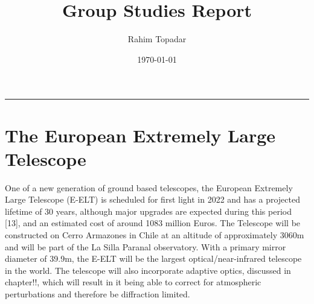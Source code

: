 \documentclass[pdf,color]{UoBnote}
\author{Rahim Topadar}
\title{Group Studies Report}
\date{\today}
\begin{document}
\maketitle
\tableofcontents
\vspace{1cm}\hrule \vspace{1cm}

\section{The European Extremely Large Telescope}

One of a new generation of ground based telescopes, the European Extremely Large Telescope (E-ELT) is scheduled for first light in 2022 and has a projected lifetime of 30 years, although major upgrades are expected during this period [13], and an estimated cost of around 1083 million Euros. The Telescope will be constructed on Cerro Armazones in Chile at an altitude of approximately 3060m and will be part of the La Silla Paranal observatory. With a primary mirror diameter of 39.9m, the E-ELT will be the largest optical/near-infrared telescope in the world. The telescope will also incorporate adaptive optics, discussed in chapter!!, which will result in it being able to correct for atmospheric perturbations and therefore be diffraction limited.  
\end{document}
